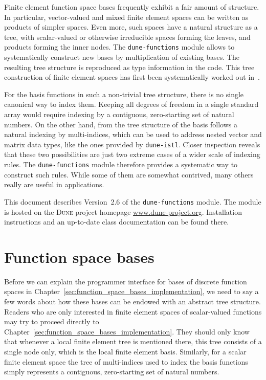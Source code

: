 \documentclass[a4paper,10pt,headings=normal,bibliography=totoc]{scrartcl}
\newcommand{\dune}{\textsc{Dune}\xspace}
\newcommand{\dunemodule}[1]{\texttt{#1}}
\begin{document}
Finite element function space bases frequently exhibit a fair amount of structure.  In particular, vector-valued
and mixed finite element spaces can be written as products of simpler spaces. Even more, such spaces
have a natural structure as a tree, with scalar-valued or otherwise irreducible spaces forming the leaves, and
products forming the inner nodes. The \dunemodule{dune-functions} module
allows to systematically construct new bases by multiplication of existing bases.
The resulting tree structure is reproduced as type information in the code.
This tree construction of finite element spaces has first been systematically worked out in~\cite{muething:2015}.

For the basis functions in such a non-trivial tree structure, there is no single canonical way
to index them.  Keeping all degrees of freedom in a single standard array would require indexing
by a contiguous, zero-starting set of natural numbers. On the other hand, from the tree structure
of the basis follows a natural indexing by multi-indices, which can be used to address nested
vector and matrix data types, like the ones provided by \dunemodule{dune-istl}. Closer inspection
reveals that these two possibilities are just two extreme cases of a wider scale of indexing rules.
The \dunemodule{dune-functions} module therefore provides a systematic way to construct such
rules.  While some of them are somewhat contrived, many others really are useful
in applications.

This document describes Version~2.6 of the \dunemodule{dune-functions} module.
The module is hosted on the \dune project homepage \url{www.dune-project.org}.
Installation instructions and an up-to-date class documentation can be found there.


\newpage

\setcounter{tocdepth}{2}  %
\tableofcontents



\section{Function space bases}
\label{sec:finite_element_trees}


Before we can explain the programmer interface for bases of discrete function spaces in Chapter~\ref{sec:function_space_bases_implementation},
we need to say a few words about how these bases can be endowed with an abstract tree structure.
Readers who are only interested in finite element spaces of scalar-valued functions may try to proceed directly to
Chapter~\ref{sec:function_space_bases_implementation}.  They should only know that whenever a
local finite element tree
is mentioned there, this tree consists of a single node only, which is the local finite element basis.
Similarly, for a scalar finite element space the tree of multi-indices used to index the
basis functions simply represents a contiguous, zero-starting set of natural numbers.
\end{document}
